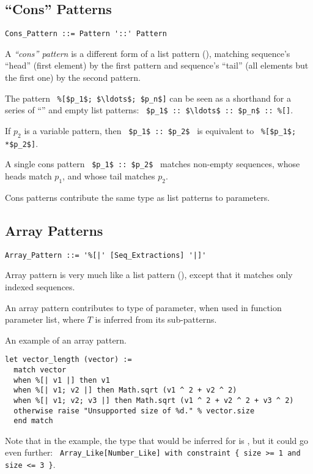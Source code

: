 \subsection{``Cons'' Patterns}
\label{sec:cons-patterns}

\syntax\begin{lstlisting}
Cons_Pattern ::= Pattern '::' Pattern
\end{lstlisting}

A {\em ``cons'' pattern} is a different form of a list pattern (), matching sequence's ``head'' (first element) by the first pattern and sequence's ``tail'' (all elements but the first one) by the second pattern. 

The pattern ~\lstinline!%[$p_1$; $\ldots$; $p_n$]! can be seen as a shorthand for a series of ``\code{::}'' and empty list patterns: ~\lstinline!$p_1$ :: $\ldots$ :: $p_n$ :: %[]!. 

If $p_2$ is a variable pattern, then ~\lstinline!$p_1$ :: $p_2$!~ is equivalent to ~\lstinline!%[$p_1$; *$p_2$]!. 

A single cons pattern ~\lstinline!$p_1$ :: $p_2$!~ matches non-empty sequences, whose heads match $p_1$, and whose tail matches $p_2$. 

Cons patterns contribute the same type as list patterns to parameters. 





\subsection{Array Patterns}
\label{sec:array-patterns}

\syntax\begin{lstlisting}
Array_Pattern ::= '%[|' [Seq_Extractions] '|]'
\end{lstlisting}

Array pattern is very much like a list pattern (), except that it matches only indexed sequences. 

An array pattern contributes  to type of parameter, when used in function parameter list, where $T$ is inferred from its sub-patterns. 

\example An example of an array pattern.
\begin{lstlisting}[deletekeywords={of}]
let vector_length (vector) := 
  match vector 
  when %[| v1 |] then v1
  when %[| v1; v2 |] then Math.sqrt (v1 ^ 2 + v2 ^ 2)
  when %[| v1; v2; v3 |] then Math.sqrt (v1 ^ 2 + v2 ^ 2 + v3 ^ 2)
  otherwise raise "Unsupported size of %d." % vector.size
  end match
\end{lstlisting}
Note that in the example, the type that would be inferred for  is , but it could go even further: ~\lstinline!Array_Like[Number_Like] with constraint { size >= 1 and size <= 3 }!. 






